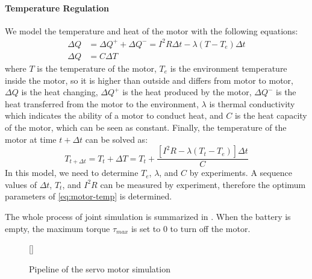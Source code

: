 \documentclass{llncs}
\newcommand{\inputtikz}[1]
{
  \StrSubstitute{#1}{/}{.}[\fn]
  \scancs{\filename}{\fn}
  \tikzsetfigurename{\filename}
  
}
\begin{document}
\paragraph{Temperature Regulation}
We model the temperature and heat of the motor with the following equations:
\begin{align}
  \Delta{}Q &= \Delta{}Q^+ + \Delta{}Q^- = I^2R\Delta{}t -\lambda(T-T_e)\Delta{}t \\
  \Delta{}Q &= C\Delta{}T
\end{align}
where $T$ is the temperature of the motor, $T_e$
is the environment temperature inside the motor, so it is higher than outside and differs from motor to motor, $\Delta{}Q$ is the
heat changing, $\Delta{}Q^+$ is the heat produced by the motor, $\Delta{}Q^-$ is
the heat transferred from the motor to the environment,  $\lambda$ is thermal conductivity which indicates the ability of a motor to conduct heat, and $C$ is the heat capacity of
the motor, which can be seen as constant. Finally, the temperature of
the motor at time $t+\Delta{}t$ can be solved as:
\begin{equation}
  \label{eq:motor-temp}
  T_{t+\Delta{}t} = T_t + \Delta{}T = T_t + \frac{[I^2R-\lambda(T_t-T_e)]\Delta{}t}{C}
\end{equation}
In this model, we need to determine $T_e$, $\lambda$, and $C$ by experiments.
A sequence values of $\Delta{}t$, $T_t$, and $I^2R$ can be measured by experiment, therefore the optimum parameters of \cref{eq:motor-temp} is determined.

The whole process of joint simulation is summarized in
.
When the battery is empty, the maximum torque $\tau_{max}$ is set to 0 to turn off the motor.
\begin{figure}
  \centering
  \inputtikz{joint}
  \caption{Pipeline of the servo motor simulation}
  \label{fig:joint}
\end{figure}
\end{document}
